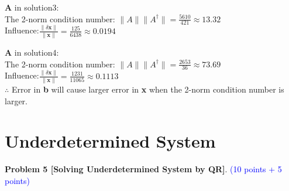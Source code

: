 \documentclass[english,onecolumn]{IEEEtran}
\begin{document}
\begin{enumerate}
    $\mathbf{A}$ in solution3:\\
    The 2-norm condition number: $ \|A\| \|A^{\dagger}\| = \frac{5610}{421} \approx 13.32 $ \\
    Influence:$ \frac{\| \delta \mathbf{x} \|}{\| \mathbf{ x}\|} = \frac{125}{6438} \approx 0.0194 $
    
    $\mathbf{A}$ in solution4:\\
    The 2-norm condition number: $ \|A\| \|A^{\dagger}\| = \frac{2653}{36} \approx 73.69 $ \\
    Influence:$ \frac{\| \delta \mathbf{x} \|}{\| \mathbf{ x}\|} = \frac{1231}{11065} \approx 0.1113 $\\
    $\therefore$ Error in {\bf b} will cause larger error in {\bf x} when the 2-norm condition number is larger.
    
\end{enumerate}


\newpage
\section{Underdetermined System}

\noindent\textbf{Problem 5 [Solving Underdetermined System by QR]}. \textcolor{blue}{(10 points + 5 points)}
\end{document}
